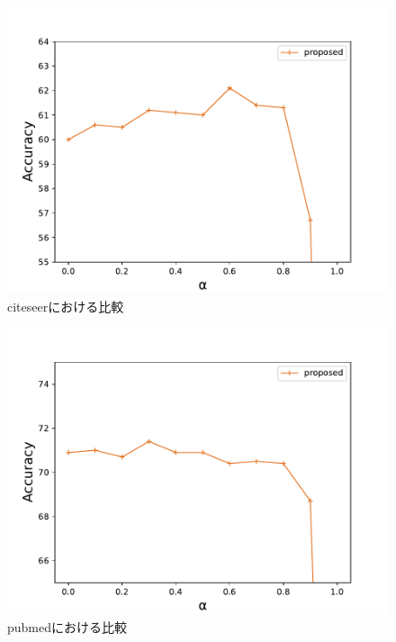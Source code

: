 \begin{figure}[h]
  \centering
    \includegraphics[width=12cm]{figures/citeseer_solo.pdf}
     \vspace*{0.5cm} 
    \caption{citeseerにおける比較} %
    \label{citeseer_alpha} %
\end{figure}

\begin{figure}[h]
  \centering
    \includegraphics[width=12cm]{figures/pubmed_solo.pdf}
     \vspace*{0.5cm} 
    \caption{pubmedにおける比較} %
    \label{pubmed_alpha} %
\end{figure}


